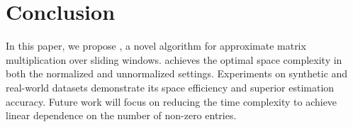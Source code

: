 \section{Conclusion}
\label{sec:sec-Conclusion}

In this paper, we propose \oursolution, a novel algorithm for approximate matrix multiplication over sliding windows. \oursolution achieves  the optimal space complexity  in both the normalized and unnormalized settings. Experiments on synthetic and real-world datasets demonstrate its space efficiency and superior estimation accuracy. Future work will focus on reducing the time complexity to achieve linear dependence on the number of non-zero entries.